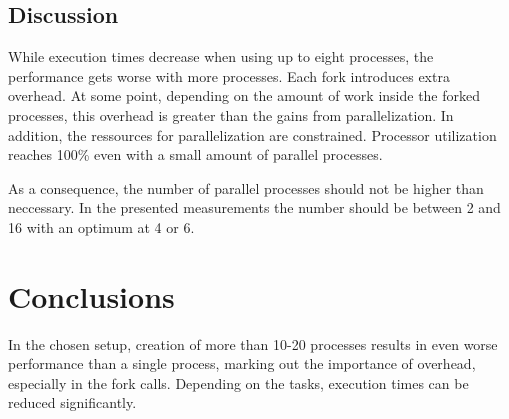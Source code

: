 \documentclass[a4paper]{article}
\begin{document}
\subsection{Discussion}
While execution times decrease when using up to eight processes, the performance gets worse with more processes. Each fork introduces extra overhead. At some point, depending on the amount of work inside the forked processes, this overhead is greater than the gains from parallelization. In addition, the ressources for parallelization are constrained. Processor utilization reaches 100\% even with a small amount of parallel processes. 

As a consequence, the number of parallel processes should not be higher than neccessary. In the presented measurements the number should be between 2 and 16 with an optimum at 4 or 6. 


\section{Conclusions}

In the chosen setup, creation of more than 10-20 processes results in even worse performance than a single process, marking out the importance of overhead, especially in the fork calls. Depending on the tasks, execution times can be reduced significantly.

% 

\end{document}
